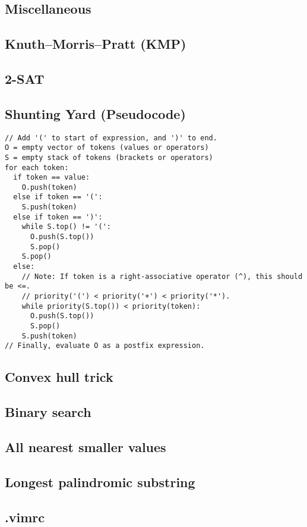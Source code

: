 \documentclass[9pt]{extarticle}
\begin{document}
\begin{multicols*}{3}
\section{Miscellaneous}

\subsection{Knuth--Morris--Pratt (KMP)} %


\subsection{2-SAT} %


\subsection{Shunting Yard (Pseudocode)} %
\begin{lstlisting}
// Add '(' to start of expression, and ')' to end.
O = empty vector of tokens (values or operators)
S = empty stack of tokens (brackets or operators)
for each token:
  if token == value:
    O.push(token)
  else if token == '(':
    S.push(token)
  else if token == ')':
    while S.top() != '(':
      O.push(S.top())
      S.pop()
    S.pop()
  else:
    // Note: If token is a right-associative operator (^), this should be <=.
	// priority('(') < priority('+') < priority('*').
    while priority(S.top()) < priority(token):
      O.push(S.top())
      S.pop()
    S.push(token)
// Finally, evaluate O as a postfix expression.
\end{lstlisting}

\subsection{Convex hull trick} %


\subsection{Binary search} %


\subsection{All nearest smaller values} %


\subsection{Longest palindromic substring} %


\subsection{.vimrc} %



\end{multicols*}
\end{document}
